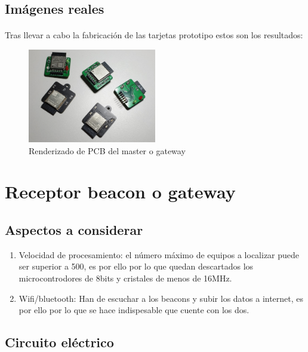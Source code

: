\documentclass[a4paper ,12pt, onecolumn]{article}
\begin{document}
    \subsection{Imágenes reales}
        \paragraph{}
        Tras llevar a cabo la fabricación de las tarjetas prototipo estos son los resultados:
        \begin{center}
            \begin{figure}[h]
                \centering
                \includegraphics[width=0.5\textwidth]{../real_beacon_pcb.jpeg}
                \caption{Renderizado de PCB del master o gateway}
                \label{fig:mesh1}
            \end{figure}    
        \end{center}       
\section{Receptor beacon o gateway}
    \subsection{Aspectos a considerar}
        \begin{enumerate}
            \item Velocidad de procesamiento: el número máximo de equipos a localizar puede ser superior a 500, es por ello 
            por lo que quedan descartados los microcontrodores de 8bits y cristales de menos de 16MHz.
            \item Wifi/bluetooth: Han de escuchar a los beacons y subir los datos a internet, es por ello por lo que se hace 
            indispesable que cuente con los dos.
        \end{enumerate}

    \subsection{Circuito eléctrico}
\end{document}
